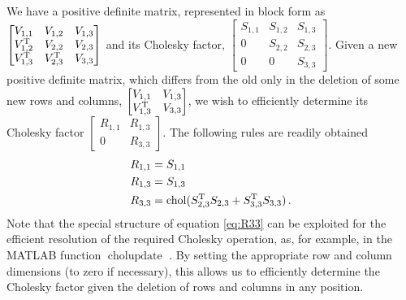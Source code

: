 \documentclass{acmtrans2m}
\begin{document}
\noindent We have a positive definite matrix, represented in block form as $\begin{bmatrix} V_{1,1} & V_{1,2} & V_{1,3} \\ V^{\mathrm{T}}_{1,2} & V_{2,2} & V_{2,3} \\ V^{\mathrm{T}}_{1,3} & V^{\mathrm{T}}_{2,3} & V_{3,3} \end{bmatrix}
$ and its Cholesky factor, $
\begin{bmatrix} S_{1,1} & S_{1,2} & S_{1,3} \\ 0 & S_{2,2} & S_{2,3} \\ 0 & 0 & S_{3,3} \end{bmatrix}
$. Given a new positive definite matrix, which differs from the old only in the deletion of some new rows and columns, $\begin{bmatrix} V_{1,1} & V_{1,3} \\ V^{\mathrm{T}}_{1,3} & V_{3,3} \end{bmatrix}$, we wish to efficiently determine its Cholesky factor $\begin{bmatrix} R_{1,1} & R_{1,3} \\ 0 & R_{3,3} \end{bmatrix}$. The following rules are readily obtained
\begin{align}
 R_{1,1}&=S_{1,1}\\
R_{1,3} &=S_{1,3}\\
R_{3,3}&=\operatorname{chol}(S^{\mathrm{T}}_{2,3}S_{2,3}+S^{\mathrm{T}}_{3,3}S_{3,3}) \label{eq:R33}\,.
\end{align}
Note that the special structure of equation \eqref{eq:R33} can be exploited for the efficient resolution of the required Cholesky operation, as, for example, in the MATLAB  function $\operatorname{cholupdate}$  \cite{Matlab}. By setting the appropriate row and column dimensions (to zero if necessary), this allows us to efficiently determine the Cholesky factor given the deletion of rows and columns in any position. 
\end{document}
